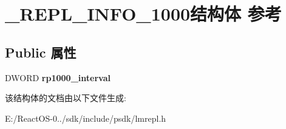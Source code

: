 \hypertarget{struct___r_e_p_l___i_n_f_o__1000}{}\section{\+\_\+\+R\+E\+P\+L\+\_\+\+I\+N\+F\+O\+\_\+1000结构体 参考}
\label{struct___r_e_p_l___i_n_f_o__1000}
\subsection*{Public 属性}
\begin{DoxyCompactItemize}
\item 
\mbox{\label{struct___r_e_p_l___i_n_f_o__1000_a9759ddbd679f52d6b30fd4fb365d708b}} 
D\+W\+O\+RD {\bfseries rp1000\+\_\+interval}
\end{DoxyCompactItemize}


该结构体的文档由以下文件生成\+:\begin{DoxyCompactItemize}
\item 
E\+:/\+React\+O\+S-\/0../sdk/include/psdk/lmrepl.\+h\end{DoxyCompactItemize}
